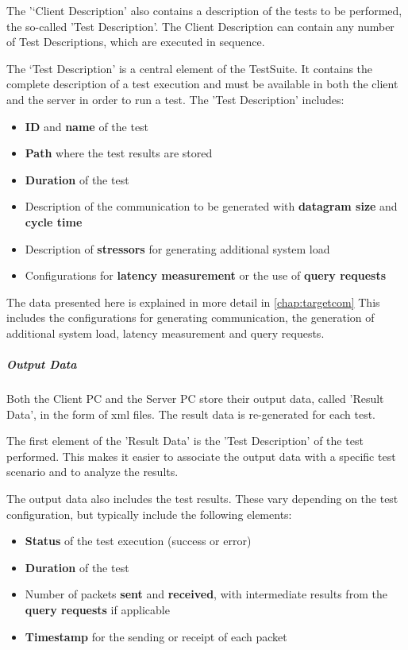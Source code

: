The '`Client Description' also contains a description of the tests to be performed, the so-called 'Test Description'. The Client Description can contain any number of Test Descriptions, which are executed in sequence.

The `Test Description' is a central element of the TestSuite. It contains the complete description of a test execution and must be available in both the client and the server in order to run a test. The 'Test Description' includes:
\begin{itemize}
	\item \textbf{ID} and \textbf{name} of the test
	\item \textbf{Path} where the test results are stored
	\item \textbf{Duration} of the test
	\item Description of the communication to be generated with \textbf{datagram size} and \textbf{cycle time}
	\item Description of \textbf{stressors} for generating additional system load
	\item Configurations for \textbf{latency measurement} or the use of \textbf{query requests}
\end{itemize}

The data presented here is explained in more detail in \ref{chap:targetcom} This includes the configurations for generating communication, the generation of additional system load, latency measurement and query requests.

\subparagraph{Output Data}

Both the Client PC and the Server PC store their output data, called 'Result Data', in the form of \ac{xml} files. The result data is re-generated for each test.

The first element of the 'Result Data' is the 'Test Description' of the test performed. This makes it easier to associate the output data with a specific test scenario and to analyze the results.

The output data also includes the test results. These vary depending on the test configuration, but typically include the following elements:
\begin{itemize}
	\item \textbf{Status} of the test execution (success or error)
	\item \textbf{Duration} of the test
	\item Number of packets \textbf{sent} and \textbf{received}, with intermediate results from the \textbf{query requests} if applicable
	\item \textbf{Timestamp} for the sending or receipt of each packet
\end{itemize}

